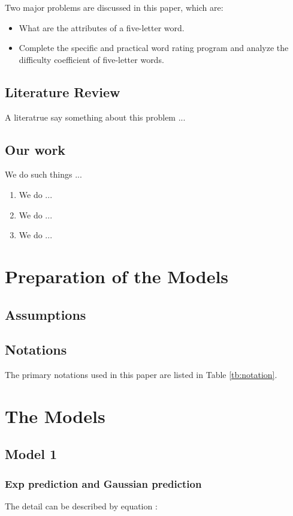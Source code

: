 \documentclass[12pt]{article}  %
\begin{document}
Two major problems are discussed in this paper, which are:
\begin{itemize}
     \item What are the attributes of a five-letter word.
    \item Complete the specific and practical word rating program and analyze the difficulty coefficient of five-letter words.
\end{itemize}

\subsection{Literature Review}
A literatrue\cite{1} say something about this problem ...

\subsection{Our work}
We do such things ...

\begin{enumerate}[\bfseries 1.]
    \item We do ...
    \item We do ...
    \item We do ...
\end{enumerate}

\section{Preparation of the Models}
\subsection{Assumptions}

\subsection{Notations}
The primary notations used in this paper are listed in Table \ref{tb:notation}.



\section{The Models}
\subsection{Model 1}
\subsubsection{Exp prediction and Gaussian prediction}
The detail can be described by equation :
\end{document}

